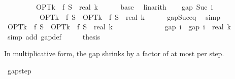 \begin{isabellebody}
\ \ \ \ \ \ \ \ {\isacharminus}{\kern0pt}\ {\isacharparenleft}{\kern0pt}OPT{\isacharunderscore}{\kern0pt}k\ {\isacharminus}{\kern0pt}\ f\ {\isacharquery}{\kern0pt}S{\isacharparenright}{\kern0pt}\ {\isacharslash}{\kern0pt}\ real\ k{\isachardoublequoteclose}\isanewline
\ \ \ \ \isamarkupfalse%
\ base\ \isamarkupfalse%
\ linarith\isanewline
\ \ \isamarkupfalse%
\ {\isachardoublequoteopen}gap\ {\isacharparenleft}{\kern0pt}Suc\ i{\isacharparenright}{\kern0pt}\isanewline
\ \ \ \ \ \ \ \ \ {\isasymle}\ OPT{\isacharunderscore}{\kern0pt}k\ {\isacharminus}{\kern0pt}\ f\ {\isacharquery}{\kern0pt}S\ {\isacharminus}{\kern0pt}\ {\isacharparenleft}{\kern0pt}OPT{\isacharunderscore}{\kern0pt}k\ {\isacharminus}{\kern0pt}\ f\ {\isacharquery}{\kern0pt}S{\isacharparenright}{\kern0pt}\ {\isacharslash}{\kern0pt}\ real\ k{\isachardoublequoteclose}\isanewline
\ \ \ \ \isamarkupfalse%
\ gap{\isacharunderscore}{\kern0pt}Suc{\isacharunderscore}{\kern0pt}eq\ \isamarkupfalse%
\ simp\isanewline
\isanewline
\ \ \isamarkupfalse%
\ \isamarkupfalse%
\ {\isachardoublequoteopen}OPT{\isacharunderscore}{\kern0pt}k\ {\isacharminus}{\kern0pt}\ f\ {\isacharquery}{\kern0pt}S\ {\isacharminus}{\kern0pt}\ {\isacharparenleft}{\kern0pt}OPT{\isacharunderscore}{\kern0pt}k\ {\isacharminus}{\kern0pt}\ f\ {\isacharquery}{\kern0pt}S{\isacharparenright}{\kern0pt}\ {\isacharslash}{\kern0pt}\ real\ k\isanewline
\ \ \ \ \ \ \ \ \ \ \ \ \ {\isacharequal}{\kern0pt}\ gap\ i\ {\isacharminus}{\kern0pt}\ gap\ i\ {\isacharslash}{\kern0pt}\ real\ k{\isachardoublequoteclose}\isanewline
\ \ \ \ \isamarkupfalse%
\ {\isacharparenleft}{\kern0pt}simp\ add{\isacharcolon}{\kern0pt}\ gap{\isacharunderscore}{\kern0pt}def{\isacharparenright}{\kern0pt}\isanewline
\isanewline
\ \ \isamarkupfalse%
\ \isamarkupfalse%
\ {\isacharquery}{\kern0pt}thesis\ \isakeywordONE{{\isachardot}{\kern0pt}}\isamarkupfalse%
\isanewline
{}\isamarkupfalse%
%
\endisatagproof
{\isafoldproof}%
%
\isadelimproof
%
\endisadelimproof
%
\begin{isamarkuptext}%
In multiplicative form, the gap shrinks by a factor of at most
   per step.%
\end{isamarkuptext}\isamarkuptrue%
\isamarkupfalse%
\ gap{\isacharunderscore}{\kern0pt}step{\isacharcolon}{\kern0pt}\isanewline

\end{isabellebody}
